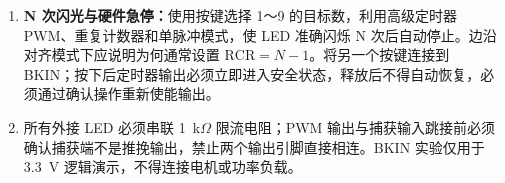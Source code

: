 \documentclass[UTF8,zihao=5,fontset=fandol]{ctexart}
\begin{document}
\begin{reportsection}{\PurposeTitle}{}
\begin{enumerate}[label=\arabic*)]
    \item \textbf{N 次闪光与硬件急停：}使用按键选择 1～9 的目标数，利用高级定时器 PWM、重复计数器和单脉冲模式，使 LED 准确闪烁 N 次后自动停止。边沿对齐模式下应说明为何通常设置 $\mathrm{RCR}=N-1$。将另一个按键连接到 BKIN；按下后定时器输出必须立即进入安全状态，释放后不得自动恢复，必须通过确认操作重新使能输出。


    \item 所有外接 LED 必须串联 1~k$\Omega$ 限流电阻；PWM 输出与捕获输入跳接前必须确认捕获端不是推挽输出，禁止两个输出引脚直接相连。BKIN 实验仅用于 3.3~V 逻辑演示，不得连接电机或功率负载。

  \end{enumerate}
\end{reportsection}

\begin{reportsection}{\MethodTitle}{\MethodHint}
\end{reportsection}

\begin{reportsection}{\ProcessTitle}{\ProcessHint}
\end{reportsection}

\begin{reportsection}{\ConclusionTitle}{\ConclusionHint}
\end{reportsection}

\begin{reportsection}{\ReflectionTitle}{\ReflectionHint}

  \par\medskip\noindent \ReviewNote
\end{reportsection}

\clearpage
\end{document}
